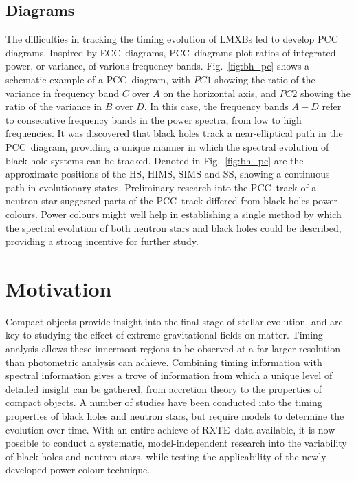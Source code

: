 \subsection{ Diagrams}
The difficulties in tracking the timing evolution of \acp{LMXB} led \citet{heil2015power} to develop \acf{PCC} diagrams. Inspired by \ac{ECC}~diagrams, \ac{PCC}~diagrams plot ratios of integrated power, or variance, of various frequency bands. Fig.~\ref{fig:bh_pc} shows a schematic example of a \ac{PCC}~diagram, with $PC1$ showing the ratio of the variance in frequency band $C$ over $A$ on the horizontal axis, and $PC2$ showing the ratio of the variance in $B$ over $D$. In this case, the frequency bands $A-D$ refer to consecutive frequency bands in the power spectra, from low to high frequencies. It was discovered that black holes track a near-elliptical path in the \ac{PCC}~diagram, providing a unique manner in which the spectral evolution of black hole systems can be tracked. Denoted in Fig.~\ref{fig:bh_pc} are the approximate positions of the \ac{HS}, \ac{HIMS}, \ac{SIMS} and \ac{SS}, showing a continuous path in evolutionary states. Preliminary research into the \ac{PCC}~track of a neutron star suggested parts of the \ac{PCC}~track differed from black holes power colours. Power colours might well help in establishing a single method by which the spectral evolution of both neutron stars and black holes could be described, providing a strong incentive for further study. \\

\enlargethispage{2\baselineskip}
\section{Motivation}
Compact objects provide insight into the final stage of stellar evolution, and are key to studying the effect of extreme gravitational fields on matter. Timing analysis allows these innermost regions to be observed at a far larger resolution than photometric analysis can achieve. Combining timing information with spectral information gives a trove of information from which a unique level of detailed insight can be gathered, from accretion theory to the properties of compact objects. A number of studies have been conducted into the timing properties of black holes and neutron stars, but require models to determine the evolution over time. With an entire achieve of \ac{RXTE}~data available, it is now possible to conduct a systematic, model-independent research into the variability of black holes and neutron stars, while testing the applicability of the newly-developed power colour technique.\\

